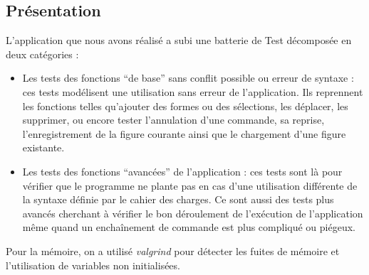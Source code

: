 \documentclass[12pt]{article}
\begin{document}
\subsection{Présentation}
L’application que nous avons réalisé a subi une batterie de Test décomposée en deux catégories :
\begin{itemize}
\item Les tests des fonctions “de base” sans conflit possible ou erreur de syntaxe : ces tests modélisent une utilisation sans erreur de l’application. Ils reprennent les fonctions telles qu’ajouter des formes ou des sélections, les déplacer, les supprimer, ou encore tester l’annulation d’une commande, sa reprise, l’enregistrement de la figure courante ainsi que le chargement d’une figure existante.
\item Les tests des fonctions “avancées” de l’application : ces tests sont là pour vérifier que le programme ne plante pas en cas d’une utilisation différente de la syntaxe définie par le cahier des charges. Ce sont aussi des tests plus avancés cherchant à vérifier le bon déroulement de l'exécution de l'application même quand un enchaînement de commande est plus compliqué ou piégeux.
\end{itemize}
Pour la mémoire, on a utilisé \textit{valgrind} pour détecter les fuites de mémoire et l'utilisation de variables non initialisées.
\end{document}
